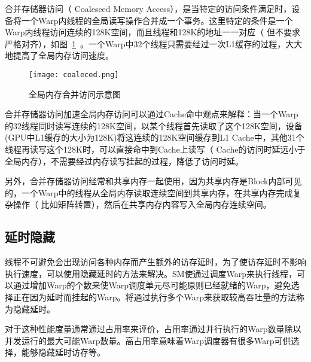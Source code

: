 合并存储器访问（ Coalesced Memory Access），是当特定的访问条件满足时，设备将一个Warp内线程的全局读写操作合并成一个事务。这里特定的条件是一个Warp内线程访问连续的128K空间，而且线程和128K的地址一一对应（ 但不要求严格对齐），如图~\ref{fig:coalesced}~\cite{woolley2013gpu}。一个Warp中32个线程只需要经过一次L1缓存的过程，大大地提高了全局内存访问速度。

\begin{figure}[H] %
	\centering
	\texttt{[image: coaleced.png]}
	\caption{全局内存合并访问示意图}
	\label{fig:coalesced}
\end{figure}

合并存储器访问加速全局内存访问可以通过Cache命中观点来解释：当一个Warp的32线程同时读写连续的128K空间，以某个线程首先读取了这个128K空间，设备(GPU中L1缓存的大小为128K)将这连续的128K空间缓存到L1 Cache中，其他31个线程再读写这个128K时，可以直接命中到Cache上读写（ Cache的访问时延远小于全局内存），不需要经过内存读写挂起的过程，降低了访问时延。

另外，合并存储器访问经常和共享内存一起使用，因为共享内存是Block内部可见的，一个Warp中的线程从全局内存读取连续空间到共享内存，在共享内存完成复杂操作（ 比如矩阵转置），然后在共享内存内容写入全局内存连续空间。


\subsection{延时隐藏}

线程不可避免会出现访问各种内存而产生额外的访存延时，为了使访存延时不影响执行速度，可以使用隐藏延时的方法来解决。SM使通过调度Warp来执行线程，可以通过增加Warp的个数来使Warp调度单元尽可能原则已经就绪的Warp，避免选择正在因为延时而挂起的Warp。将通过执行多个Warp来获取较高吞吐量的方法称为隐藏延时。

对于这种性能度量通常通过占用率来评价，占用率通过并行执行的Warp数量除以并发运行的最大可能Warp数量。高占用率意味着Warp调度器有很多Warp可供选择，能够隐藏延时访存等。

{\color{red}{按照下面方法计算占有率，这个得做实验}}

